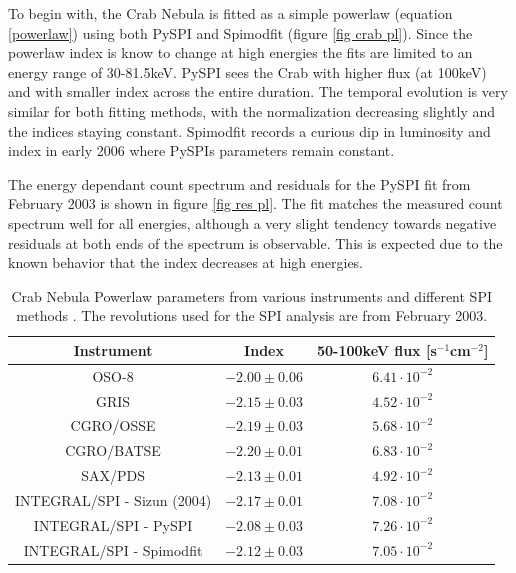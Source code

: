 \documentclass{report}
\begin{document}
To begin with, the Crab Nebula is fitted as a simple powerlaw (equation \ref{powerlaw}) using both PySPI and Spimodfit (figure \ref{fig crab pl}). Since the powerlaw index is know to change at high energies the fits are limited to an energy range of 30-81.5keV. PySPI sees the Crab with higher flux (at 100keV) and with smaller index across the entire duration. The temporal evolution is very similar for both fitting methods, with the normalization decreasing slightly and the indices staying constant. Spimodfit records a curious dip in luminosity and index in early 2006 where PySPIs parameters remain constant.

The energy dependant count spectrum and residuals for the PySPI fit from February 2003 is shown in figure \ref{fig res pl}. The fit matches the measured count spectrum well for all energies, although a very slight tendency towards negative residuals at both ends of the spectrum is observable. This is expected due to the known behavior that the index decreases at high energies.





\begin{table}[]
  \centering
  \begin{tabular}{|c|c|c|}
  \hline
  \textbf{Instrument}         & \textbf{Index} & \textbf{50-100keV flux {[}s$^{-1}$cm$^{-2}${]}} \\ \hline
  OSO-8                       & $-2.00\pm0.06$ & $6.41\cdot 10^{-2}$                             \\ \hline
  GRIS                        & $-2.15\pm0.03$ & $4.52\cdot 10^{-2}$                             \\ \hline
  CGRO/OSSE                   & $-2.19\pm0.03$ & $5.68\cdot 10^{-2}$                             \\ \hline
  CGRO/BATSE                  & $-2.20\pm0.01$ & $6.83\cdot 10^{-2}$                             \\ \hline
  SAX/PDS                     & $-2.13\pm0.01$ & $4.92\cdot 10^{-2}$                             \\ \hline
  INTEGRAL/SPI - Sizun (2004) & $-2.17\pm0.01$ & $7.08\cdot 10^{-2}$                             \\ \hline
  INTEGRAL/SPI - PySPI        & $-2.08\pm0.03$ & $7.26\cdot 10^{-2}$                             \\ \hline
  INTEGRAL/SPI - Spimodfit    & $-2.12\pm0.03$ & $7.05\cdot 10^{-2}$                             \\ \hline
  \end{tabular}
  \caption{Crab Nebula Powerlaw parameters from various instruments and different SPI methods \cite{sizun2004integralspi}. The revolutions used for the SPI analysis are from February 2003.}
  \label{tab crab comparison}
\end{table}
\end{document}

